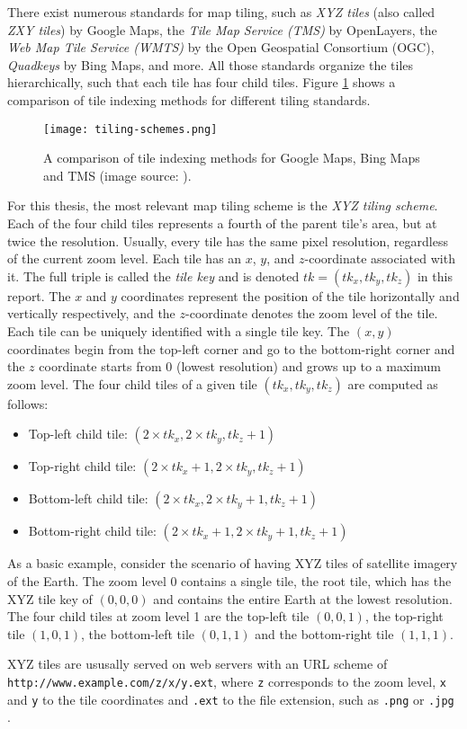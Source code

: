 There exist numerous standards for map tiling, such as \textit{XYZ tiles} (also called \textit{ZXY tiles}) by Google Maps,
the \textit{Tile Map Service (TMS)} by OpenLayers, the \textit{Web Map Tile Service (WMTS)}
by the Open Geospatial Consortium (OGC), \textit{Quadkeys} by Bing Maps, and more.
All those standards organize the tiles hierarchically, such that each 
tile has four child tiles.
Figure \ref{fig:tiling-schemes} shows a comparison of tile indexing methods
for different tiling standards.

\begin{figure}[H]
  \centering  
  \texttt{[image: tiling-schemes.png]}
  \caption{A comparison of tile indexing methods for Google Maps, Bing Maps and TMS (image source: \cite{tileimage}).}\label{fig:tiling-schemes}
\end{figure}

For this thesis, the most relevant map tiling scheme is the \textit{XYZ tiling scheme}. 
Each of the four child tiles represents a fourth of the parent tile's area, but at twice the resolution.
Usually, every tile has the same pixel resolution, regardless of the current zoom level.
Each tile has an $x$, $y$, and $z$-coordinate associated with it. 
The full triple is called the \textit{tile key} and is denoted $tk = (tk_x, tk_ y, tk_z)$ in this report. 
The $x$ and $y$ coordinates represent the position of the tile 
horizontally and vertically respectively, and the $z$-coordinate 
denotes the zoom level of the tile. Each tile can be 
uniquely identified with a single tile key.
The $(x,y)$ coordinates 
begin from the top-left corner and go to the bottom-right corner and the $z$ coordinate 
starts from 0 (lowest resolution) and grows up to a maximum zoom level.
The four child tiles of a given tile $(tk_x,tk_y,tk_z)$ are computed as follows: 
\begin{itemize}
  \item Top-left child tile: $(2 \times tk_x, 2 \times tk_y, tk_z + 1)$
  \item Top-right child tile: $(2 \times tk_x + 1, 2 \times tk_y, tk_z + 1)$
  \item Bottom-left child tile: $(2 \times tk_x, 2 \times tk_y + 1, tk_z + 1)$
  \item Bottom-right child tile: $(2 \times tk_x + 1, 2 \times tk_y + 1, tk_z + 1)$
\end{itemize}

As a basic example, consider the scenario of having XYZ tiles of satellite imagery of the Earth.
The zoom level 0 contains a single tile, the root tile, which has the XYZ tile key of $(0,0,0)$ 
and contains the entire Earth at the lowest resolution. 
The four child tiles at zoom level 1 are the top-left tile $(0,0,1)$, the top-right tile $(1,0,1)$,
the bottom-left tile $(0,1,1)$ and the bottom-right tile $(1,1,1)$.

XYZ tiles are ususally served on web servers 
with an URL scheme of \\ \texttt{http://www.example.com/z/x/y.ext},
where \texttt{z} corresponds to the zoom level, 
\texttt{x} and \texttt{y} to the tile coordinates
and \texttt{.ext} to the file extension, such as \texttt{.png} or \texttt{.jpg} \cite{wikipediatiledwebmaps}.